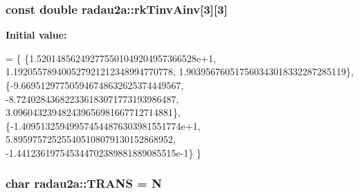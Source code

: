 \subsubsection[{\texorpdfstring{rk\+Tinv\+Ainv}{rkTinvAinv}}]{\setlength{\rightskip}{0pt plus 5cm}const double radau2a\+::rk\+Tinv\+Ainv\mbox{[}3\mbox{]}\mbox{[}3\mbox{]}\hspace{0.3cm}{\ttfamily [static]}}\hypertarget{namespaceradau2a_a048232e984719eb1fed3f8ba7fb4c25b}{}\label{namespaceradau2a_a048232e984719eb1fed3f8ba7fb4c25b}
{\bfseries Initial value\+:}
\begin{DoxyCode}
= \{
\{1.520148562492775501049204957366528e+1,
1.192055789400527921212348994770778,
1.903956760517560343018332287285119\},
\{-9.669512977505946748632625374449567,
-8.724028436822336183071773193986487,
3.096043239482439656981667712714881\},
\{-1.409513259499574544876303981551774e+1,
5.895975725255405108079130152868952,
-1.441236197545344702389881889085515e-1\}
\}
\end{DoxyCode}
\subsubsection[{\texorpdfstring{T\+R\+A\+NS}{TRANS}}]{\setlength{\rightskip}{0pt plus 5cm}char radau2a\+::\+T\+R\+A\+NS = \textquotesingle{}N\textquotesingle{}\hspace{0.3cm}{\ttfamily [static]}}\hypertarget{namespaceradau2a_ac3a739e01fca1200932ac123dc0bf0fa}{}\label{namespaceradau2a_ac3a739e01fca1200932ac123dc0bf0fa}
